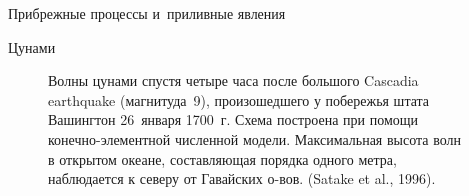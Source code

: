 \begin{chapter}{Прибрежные процессы и~приливные явления}
\begin{section}{Цунами}
\begin{figure}[t!]
\caption{Волны цунами спустя четыре часа
после большого Cascadia earthquake (магнитуда~9), произошедшего 
у побережья штата Вашингтон 26~января 1700~г. Схема построена при помощи
конечно-элементной численной модели. Максимальная высота волн в открытом
океане, составляющая порядка одного метра, наблюдается к северу от Гавайских
о-вов. (Satake et al., 1996).}
\label{fig:tsunamiwave}
\end{figure}
%
%


\end{section}
\end{chapter}
